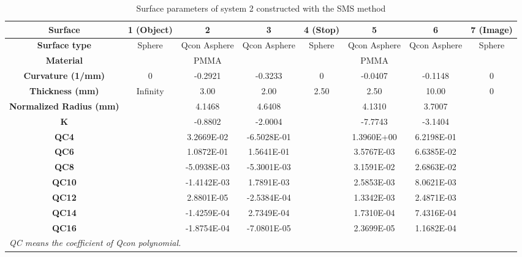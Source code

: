 \newpage

\setlength{\arrayrulewidth}{.5mm}
\setlength{\tabcolsep}{18pt}
\renewcommand{\arraystretch}{1.2}
\begin{table}[h!]
    \centering
    \captionsetup{justification=centering}
    \caption{Surface parameters of system 2 constructed with the SMS method}
    \label{table: chap5 - sys2 - SMS+OPT}
    \vspace{-1em}
    \begin{adjustbox}{max width=\textwidth, center}
    \begin{tabular}{c c c c c c c c}
    \hline 
     \textbf{Surface} & \textbf{1 (Object)} & \textbf{2}  & \textbf{3} &\textbf{4 (Stop)} & \textbf{5} & \textbf{6} & \textbf{7 (Image)}\\ 
     \midrule
    \rowcolor[gray]{0.9}  \textbf{Surface type} & Sphere & Qcon Asphere & Qcon Asphere & Sphere & Qcon Asphere & Qcon Asphere & Sphere \\ 
    \textbf{Material} &  & PMMA &  & & PMMA & & \\
   \rowcolor[gray]{0.9}  \textbf{Curvature (1/mm)} & 0 & -0.2921 & -0.3233 & 0 & -0.0407 & -0.1148 & 0\\
    \textbf{Thickness (mm)} & Infinity & 3.00 & 2.00 & 2.50 & 2.50 & 10.00 & 0 \\ 
    \rowcolor[gray]{0.9} \textbf{Normalized Radius (mm)} & & 4.1468 & 4.6408 & & 4.1310 & 3.7007 & \\
    \textbf{K} & & -0.8802 & -2.0004 & &  -7.7743 & -3.1404 &\\
    \rowcolor[gray]{0.9} \textbf{QC4} & &   3.2669E-02 &  -6.5028E-01 & &  1.3960E+00 &    6.2198E-01 &  \\ 
    \textbf{QC6} & &    1.0872E-01 &   1.5641E-01 & &   3.5767E-03 &   6.6385E-02 &\\
   \rowcolor[gray]{0.9}  \textbf{QC8} & & -5.0938E-03 &  -5.3001E-03 &  &  3.1591E-02 &    2.6863E-02 & \\
    \textbf{QC10} & & -1.4142E-03 &    1.7891E-03 & &   2.5853E-03 &   8.0621E-03 & \\ 
   \rowcolor[gray]{0.9}  \textbf{QC12} & &   2.8801E-05 & -2.5384E-04 & &   1.3342E-03 &    2.4871E-03 &\\
    \textbf{QC14} & & -1.4259E-04 &  2.7349E-04 & &   1.7310E-04 &    7.4316E-04 & \\ 
   \rowcolor[gray]{0.9}  \textbf{QC16} & & -1.8754E-04 & -7.0801E-05 & &  2.3699E-05 &  1.1682E-04 &\\
    \hline
    \multicolumn{6}{l}{\textit{\footnotesize{QC means the coefficient of Qcon polynomial.}}}\\
    \end{tabular}
    \end{adjustbox}
\end{table}



